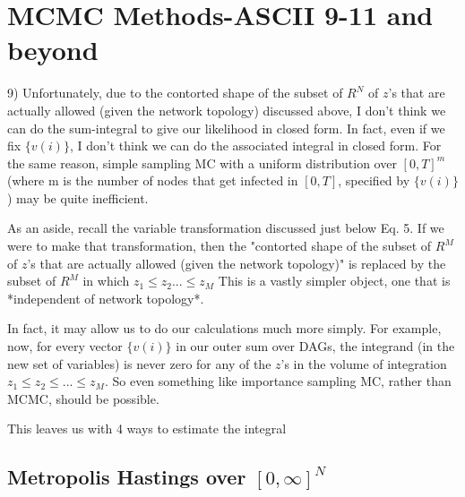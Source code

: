 \documentclass{article}
\begin{document}
\section{MCMC Methods-ASCII 9-11 and beyond}

        9) Unfortunately, due to the contorted shape of the subset of
        $R^N$ of $z$'s that are actually allowed (given the network topology)
        discussed above, I don't think we can do the sum-integral to give our
        likelihood in closed form. In fact, even if we fix $\{v(i)\}$, I don't
        think we can do the associated integral in closed form. For the same
        reason, simple sampling MC with a uniform distribution over $[0, T]^m$
        (where m is the number of nodes that get infected in $[0, T]$, specified
        by $\{v(i)\}$) may be quite inefficient.

        As an aside, recall the variable transformation discussed just below
        Eq. 5. If we were to make that transformation, then the "contorted
        shape of the subset of $R^M$ of $z$'s that are actually allowed (given the
        network topology)" is replaced by the subset of $R^M$ in which 
        $z_1 \le z_2  ...  \le z_M$ This is a vastly simpler object, one that 
        is *independent of network topology*.

        In fact, it may allow us to do our calculations much more simply. For
        example, now, for every vector $\{v(i)\}$ in our outer sum over DAGs, the 
        integrand (in the new set of variables) is never zero for any of the
        $z$'s in the volume of integration $z_1 \le z_2 \le ... \le z_M.$ So even
        something like importance sampling MC, rather than MCMC, should be
        possible. 

        This leaves us with 4 ways to estimate the integral

\subsection{Metropolis Hastings over $[0, \infty]^N$}
\end{document}
